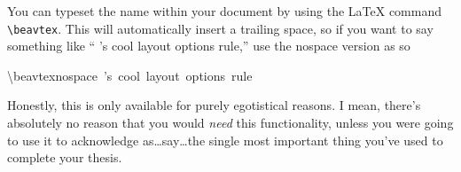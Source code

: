 You can typeset the name \beavtex within your document by using the
\LaTeX{} command \texttt{\textbackslash{}beavtex}. This will automatically
insert a trailing space, so if you want to say something like {}``\beavtexnospace
's cool layout options rule,'' use the nospace version as so

\begin{lyxcode}
\textbackslash{}beavtexnospace~'s~cool~layout~options~rule
\end{lyxcode}
Honestly, this is only available for purely egotistical reasons. I
mean, there's absolutely no reason that you would \emph{need} this
functionality, unless you were going to use it to acknowledge \beavtex
as\ldots{}say\ldots{}the single most important thing you've used
to complete your thesis.

\begin{comment}



\end{comment}

